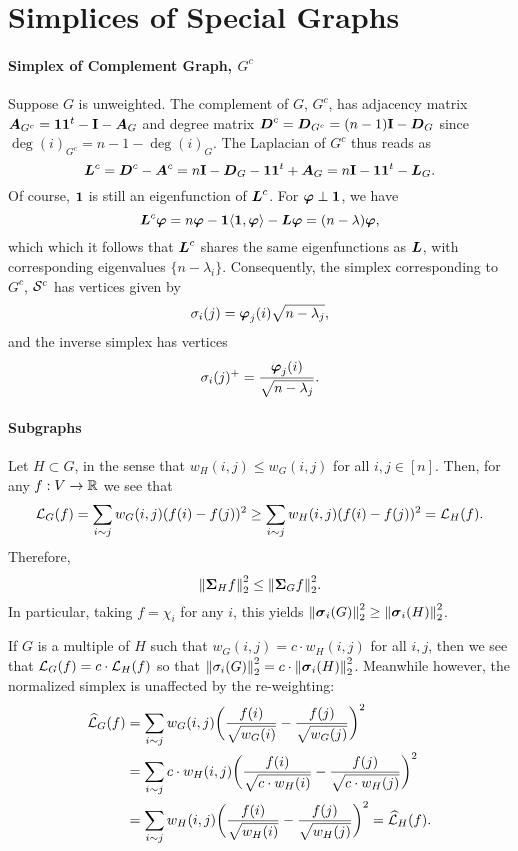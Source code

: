 \section{Simplices of Special Graphs}

\paragraph{Simplex of Complement Graph, $G^c$}
Suppose $G$ is unweighted. The complement of $G$, $G^c$, has adjacency matrix $\vb*{A}_{G^c}=\vb{1}\vb{1}^t - \vb{I}-\vb*{A}_G$ and degree matrix $\vb*{D}^c=\vb*{D}_{G^c}=(n-1)\vb{I}-\vb*{D}_G$ since $\deg(i)_{G^c}=n-1-\deg(i)_G$. The Laplacian of $G^c$ thus reads as 
\[\vb*{L}^c=\vb*{D}^c-\vb*{A}^c=n\vb{I}-\vb*{D}_G-\vb{1}\vb{1}^t+\vb*{A}_G=n\vb{I}-\vb{1}\vb{1}^t-\vb*{L}_G.\]
Of course, $\vb{1}$ is still an eigenfunction of $\vb*{L}^c$. For $\vb*{\varphi}\perp \vb{1}$, we have 
\[\vb*{L}^c\vb*{\varphi} = n\vb*{\varphi} - \vb{1}\langle \vb{1},\vb*{\varphi}\rangle - \vb*{L}\vb*{\varphi} = (n-\lambda)\vb*{\varphi},\]
which which it follows that $\vb*{L}^c$ shares the same eigenfunctions as $\vb*{L}$, with corresponding eigenvalues $\{n-\lambda_i\}$. Consequently, the simplex corresponding to $G^c$, $\mathcal{S}^c$ has vertices given by 
\[\sigma_i(j) = \vb*{\varphi}_j(i) \sqrt{n-\lambda_j},\]
and the inverse simplex has vertices 
\[\sigma_i(j)^+=\frac{\vb*{\varphi}_j(i)}{\sqrt{n-\lambda_j}}. \]



\paragraph{Subgraphs}
Let $H\subset G$, in the sense that $w_H(i,j)\leq w_G(i,j)$ for all $i,j\in [n]$. Then, for any $f:V\to\mathbb{R}$ we see that 
\[\mathcal{L}_G(f)=\sum_{i\sim j}w_G(i,j)(f(i)-f(j))^2 \geq \sum_{i\sim j}w_H(i,j)(f(i)-f(j))^2 =\mathcal{L}_H(f).\]
Therefore, 
\begin{equation*}
\norm{\boldsymbol{\Sigma}_H f}_2^2 \leq \norm{\boldsymbol{\Sigma}_G f}_2^2. 
\end{equation*}
In particular, taking $f=\chi_i$ for any $i$, this yields $\norm{\vb*{\sigma}_i(G)}_2^2\geq \norm{\vb*{\sigma}_i(H)}_2^2$. 

If $G$ is a multiple of $H$ such that $w_G(i,j)=c\cdot w_H(i,j)$ for all $i,j$, then we see that $\mathcal{L}_G(f)=c\cdot \mathcal{L}_H(f)$ so that $\norm{\sigma_i(G)}_2^2 =c\cdot \norm{\vb*{\sigma}_i(H)}_2^2$. Meanwhile however, the normalized simplex is unaffected by the re-weighting: 
\begin{align*}\widehat{\mathcal{L}}_G(f)&=\sum_{i\sim j}w_G(i,j)\bigg(\frac{f(i)}{\sqrt{w_G(i)}}-\frac{f(j)}{\sqrt{w_G(j)}}\bigg)^2\\
&= \sum_{i\sim j}c\cdot w_H(i,j)\bigg(\frac{f(i)}{\sqrt{c\cdot w_H(i)}}-\frac{f(j)}{\sqrt{c\cdot w_H(j)}}\bigg)^2 \\
&= \sum_{i\sim j} w_H(i,j)\bigg(\frac{f(i)}{\sqrt{ w_H(i)}}-\frac{f(j)}{\sqrt{ w_H(j)}}\bigg)^2 = \widehat{\mathcal{L}}_H(f).
\end{align*}

